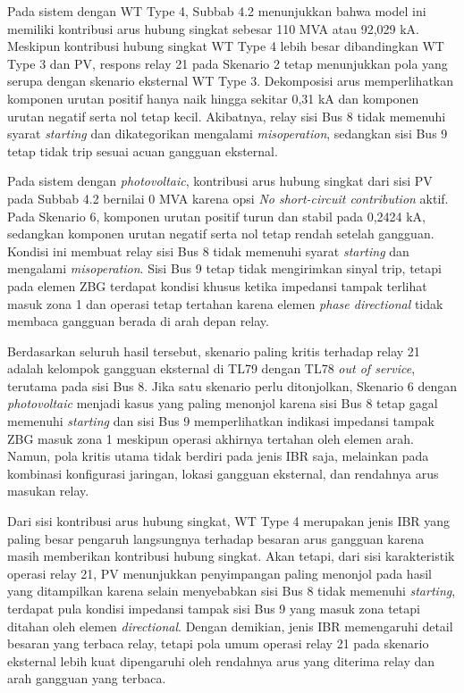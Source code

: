 Pada sistem dengan WT Type 4, Subbab 4.2 menunjukkan bahwa model ini memiliki kontribusi arus hubung singkat sebesar 110 MVA atau 92,029 kA. Meskipun kontribusi hubung singkat WT Type 4 lebih besar dibandingkan WT Type 3 dan PV, respons relay 21 pada Skenario 2 tetap menunjukkan pola yang serupa dengan skenario eksternal WT Type 3. Dekomposisi arus memperlihatkan komponen urutan positif hanya naik hingga sekitar 0,31 kA dan komponen urutan negatif serta nol tetap kecil. Akibatnya, relay sisi Bus 8 tidak memenuhi syarat \textit{starting} dan dikategorikan mengalami \textit{misoperation}, sedangkan sisi Bus 9 tetap tidak trip sesuai acuan gangguan eksternal.

Pada sistem dengan \textit{photovoltaic}, kontribusi arus hubung singkat dari sisi PV pada Subbab 4.2 bernilai 0 MVA karena opsi \textit{No short-circuit contribution} aktif. Pada Skenario 6, komponen urutan positif turun dan stabil pada 0,2424 kA, sedangkan komponen urutan negatif serta nol tetap rendah setelah gangguan. Kondisi ini membuat relay sisi Bus 8 tidak memenuhi syarat \textit{starting} dan mengalami \textit{misoperation}. Sisi Bus 9 tetap tidak mengirimkan sinyal trip, tetapi pada elemen ZBG terdapat kondisi khusus ketika impedansi tampak terlihat masuk zona 1 dan operasi tetap tertahan karena elemen \textit{phase directional} tidak membaca gangguan berada di arah depan relay.

Berdasarkan seluruh hasil tersebut, skenario paling kritis terhadap relay 21 adalah kelompok gangguan eksternal di TL79 dengan TL78 \textit{out of service}, terutama pada sisi Bus 8. Jika satu skenario perlu ditonjolkan, Skenario 6 dengan \textit{photovoltaic} menjadi kasus yang paling menonjol karena sisi Bus 8 tetap gagal memenuhi \textit{starting} dan sisi Bus 9 memperlihatkan indikasi impedansi tampak ZBG masuk zona 1 meskipun operasi akhirnya tertahan oleh elemen arah. Namun, pola kritis utama tidak berdiri pada jenis IBR saja, melainkan pada kombinasi konfigurasi jaringan, lokasi gangguan eksternal, dan rendahnya arus masukan relay.

Dari sisi kontribusi arus hubung singkat, WT Type 4 merupakan jenis IBR yang paling besar pengaruh langsungnya terhadap besaran arus gangguan karena masih memberikan kontribusi hubung singkat. Akan tetapi, dari sisi karakteristik operasi relay 21, PV menunjukkan penyimpangan paling menonjol pada hasil yang ditampilkan karena selain menyebabkan sisi Bus 8 tidak memenuhi \textit{starting}, terdapat pula kondisi impedansi tampak sisi Bus 9 yang masuk zona tetapi ditahan oleh elemen \textit{directional}. Dengan demikian, jenis IBR memengaruhi detail besaran yang terbaca relay, tetapi pola umum operasi relay 21 pada skenario eksternal lebih kuat dipengaruhi oleh rendahnya arus yang diterima relay dan arah gangguan yang terbaca.

